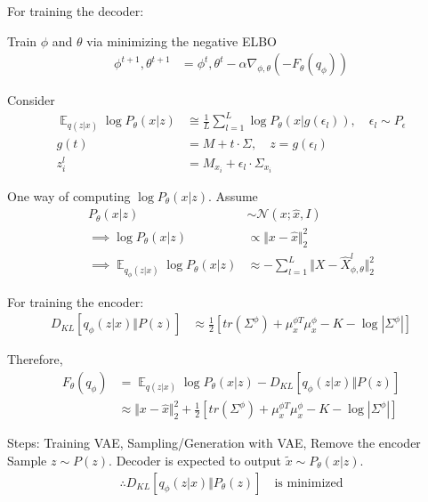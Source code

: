 \documentclass[11pt]{article}
\DeclareMathOperator*{\E}{\mathbb{E}}
\begin{document}
\clearpage
\vspace{1em}
For training the decoder:

Train $\phi$ and $\theta$ via minimizing the negative ELBO
\begin{align*}
  \phi^{t+1}, \theta^{t+1} &= \phi^t, \theta^t - \alpha \nabla_{\phi, \theta}\left( -F_{\theta}(q_{\phi}) \right)
\end{align*}

Consider
\begin{align*}
  \E_{q(z|x)} \log P_{\theta}(x | z) &\cong \frac{1}{L} \sum_{l=1}^L \log P_{\theta}(x | g(\epsilon_l)), \quad \epsilon_l \sim P_{\epsilon} \\
  g(t) &= M + t \cdot \Sigma, \quad z = g(\epsilon_l) \\
  z_i^l &= M_{x_i} + \epsilon_l \cdot \Sigma_{x_i}
\end{align*}

One way of computing $\log P_{\theta}(x | z)$. Assume
\begin{align*}
  P_{\theta}(x | z) &\sim \mathcal{N}(x; \hat{x}, I) \\
  \implies \log P_{\theta}(x | z) &\propto \Vert x - \hat{x} \Vert_2^2 \\
  \implies \E_{q_{\phi}(z | x)} \log P_{\theta}(x | z) &\approx
                                                         - \sum_{l = 1}^L \Vert X - \hat{X}_{\phi, \theta}^l \Vert^2_2
\end{align*}

For training the encoder:
\begin{align*}
  D_{KL} \left[ q_{\phi}(z|x) \Vert P(z) \right] &\approx \frac{1}{2} \left[ tr(\Sigma^{\phi}) + \mu_x^{\phi T}\mu_x^{\phi} - K - \log |\Sigma^{\phi}| \right]
\end{align*}

Therefore,
\begin{align*}
  F_{\theta}(q_{\phi}) &= \E_{q(z|x)} \log P_{\theta}(x | z) - D_{KL} \left[ q_{\phi}(z|x) \Vert P(z) \right] \\
                       &\approx \Vert x - \hat{x} \Vert_2^2 + \frac{1}{2} \left[ tr(\Sigma^{\phi}) + \mu_x^{\phi T}\mu_x^{\phi} - K - \log |\Sigma^{\phi}| \right]
\end{align*}

\vspace{1em}
Steps: Training VAE, Sampling/Generation with VAE, Remove the encoder \\

Sample $z \sim P(z)$. Decoder is expected to output $\tilde{x} \sim P_{\theta}(x | z)$.
\begin{align*}
  \therefore D_{KL} \left[ q_{\phi}(z | x) \Vert P_{\theta}(z) \right] \quad\text{is minimized}
\end{align*}
\end{document}
